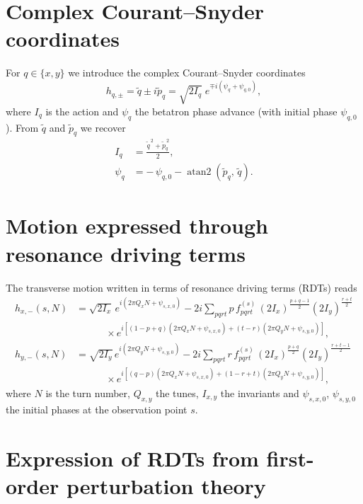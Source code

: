 \section{Complex Courant--Snyder coordinates}

For $q \in \{x,y\}$ we introduce the complex Courant--Snyder coordinates
\begin{equation}
h_{q,\pm} = \tilde q \pm i \tilde p_q = \sqrt{2 I_q}\; e^{\mp i (\psi_q + \psi_{q,0})},
\end{equation}
where $I_q$ is the action and $\psi_q$ the betatron phase advance (with initial phase $\psi_{q,0}$).
From $\tilde q$ and $\tilde p_q$ we recover
\begin{align}
I_q &= \frac{\tilde q^{\,2} + \tilde p_q^{\,2}}{2}, \\
\psi_q &= -\,\psi_{q,0} - \operatorname{atan2}\!\left(\tilde p_q,\,\tilde q\right).
\end{align}

\section{Motion expressed through resonance driving terms}

The transverse motion written in terms of resonance driving terms (RDTs) reads
\begin{align}
h_{x,-}(s,N) &= \sqrt{2 I_x}\, e^{i\left(2\pi Q_x N + \psi_{s,x,0}\right)}
- 2i \sum_{pqrt} p\, f^{(s)}_{pqrt}\, (2 I_x)^{\frac{p+q-1}{2}} (2 I_y)^{\frac{r+t}{2}} \nonumber\\
&\hspace{36pt}\times e^{i\left[(1-p+q)\left(2\pi Q_x N + \psi_{s,x,0}\right) + (t-r)\left(2\pi Q_y N + \psi_{s,y,0}\right)\right]}, \label{eq:rdt_hx}\\
h_{y,-}(s,N) &= \sqrt{2 I_y}\, e^{i\left(2\pi Q_y N + \psi_{s,y,0}\right)}
- 2i \sum_{pqrt} r\, f^{(s)}_{pqrt}\, (2 I_x)^{\frac{p+q}{2}} (2 I_y)^{\frac{r+t-1}{2}} \nonumber\\
&\hspace{36pt}\times e^{i\left[(q-p)\left(2\pi Q_x N + \psi_{s,x,0}\right) + (1-r+t)\left(2\pi Q_y N + \psi_{s,y,0}\right)\right]}, \label{eq:rdt_hy}
\end{align}
where $N$ is the turn number, $Q_{x,y}$ the tunes, $I_{x,y}$ the invariants and $\psi_{s,x,0}$, $\psi_{s,y,0}$ the initial phases at the observation point $s$.

\section{Expression of RDTs from first-order perturbation theory}

